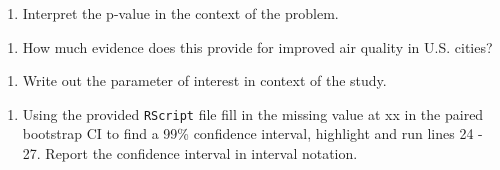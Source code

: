 \documentclass[
]{report}
\newenvironment{Shaded}{\begin{snugshade}}{\end{snugshade}}
\newcommand{\CommentTok}[1]{\textcolor[rgb]{0.56,0.35,0.01}{\textit{#1}}}
\newcommand{\DataTypeTok}[1]{\textcolor[rgb]{0.13,0.29,0.53}{#1}}
\newcommand{\DecValTok}[1]{\textcolor[rgb]{0.00,0.00,0.81}{#1}}
\newcommand{\KeywordTok}[1]{\textcolor[rgb]{0.13,0.29,0.53}{\textbf{#1}}}
\newcommand{\NormalTok}[1]{#1}
\newcommand{\OperatorTok}[1]{\textcolor[rgb]{0.81,0.36,0.00}{\textbf{#1}}}
\providecommand{\tightlist}{%
  \setlength{\itemsep}{0pt}\setlength{\parskip}{0pt}}
\begin{document}
\vspace{.3in}

\begin{enumerate}
\def\labelenumi{\arabic{enumi}.}
\setcounter{enumi}{16}
\tightlist
\item
  Interpret the p-value in the context of the problem.
\end{enumerate}

\vspace{.8in}

\begin{enumerate}
\def\labelenumi{\arabic{enumi}.}
\setcounter{enumi}{17}
\tightlist
\item
  How much evidence does this provide for improved air quality in U.S. cities?
\end{enumerate}

\vspace{.3in}

\begin{enumerate}
\def\labelenumi{\arabic{enumi}.}
\setcounter{enumi}{18}
\tightlist
\item
  Write out the parameter of interest in context of the study.
\end{enumerate}

\vspace{.6in}

\begin{enumerate}
\def\labelenumi{\arabic{enumi}.}
\setcounter{enumi}{19}
\tightlist
\item
  Using the provided \texttt{RScript} file fill in the missing value at xx in the paired bootstrap CI to find a 99\% confidence interval, highlight and run lines 24 - 27. Report the confidence interval in interval notation.
\end{enumerate}

\begin{Shaded}
\end{Shaded}
\end{document}
